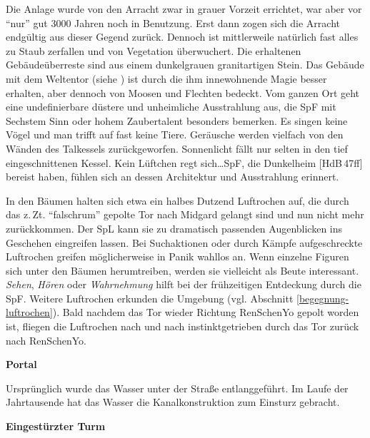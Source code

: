 \documentclass[
a4paper,
twoside,
DIV=calc,
BCOR=4mm,
fontsize=9pt,
twocolumn=on,
titlepage=on,
parskip=half
]{scrartcl}
\begin{document}
Die Anlage wurde von den Arracht zwar in grauer Vorzeit errichtet, war
aber vor "`nur"' gut 3000 Jahren noch in Benutzung. Erst dann zogen
sich die Arracht endgültig aus dieser Gegend zurück. Dennoch ist
mittlerweile natürlich fast alles zu Staub zerfallen und von
Vegetation überwuchert. Die erhaltenen Gebäudeüberreste sind aus einem
dunkelgrauen granitartigen Stein. Das Gebäude mit dem Weltentor (siehe
) ist durch die ihm innewohnende Magie besser erhalten, aber
dennoch von Moosen und Flechten bedeckt. Vom ganzen Ort geht eine
undefinierbare düstere und unheimliche Ausstrahlung aus, die SpF mit
Sechstem Sinn oder hohem Zaubertalent besonders bemerken. Es singen
keine Vögel und man trifft auf fast keine Tiere. Geräusche werden
vielfach von den Wänden des Talkessels zurückgeworfen. Sonnenlicht
fällt nur selten in den tief eingeschnittenen Kessel. Kein Lüftchen
regt sich\dots SpF, die Dunkelheim [HdB\,47ff] bereist haben, fühlen
sich an dessen Architektur und Ausstrahlung erinnert.

In den Bäumen halten sich etwa ein halbes Dutzend Luftrochen auf, die
durch das z.\,Zt. "`falschrum"' gepolte Tor nach Midgard gelangt sind
und nun nicht mehr zurückkommen. Der SpL kann sie zu dramatisch
passenden Augenblicken ins Geschehen eingreifen lassen. Bei
Suchaktionen oder durch Kämpfe aufgeschreckte Luftrochen greifen
möglicherweise in Panik wahllos an. Wenn einzelne Figuren sich unter
den Bäumen herumtreiben, werden sie vielleicht als Beute
interessant. \emph{Sehen}, \emph{Hören} oder \emph{Wahrnehmung} hilft
bei der frühzeitigen Entdeckung durch die SpF.  Weitere Luftrochen
erkunden die Umgebung (vgl. Abschnitt
\ref{begegnung-luftrochen}). Bald nachdem das Tor wieder Richtung
RenSchenYo gepolt worden ist, fliegen die Luftrochen nach und nach
instinktgetrieben durch das Tor zurück nach RenSchenYo.

\textbf{ Portal}


Ursprünglich wurde das Wasser unter der Straße entlanggeführt. Im
Laufe der Jahrtausende hat das Wasser die Kanalkonstruktion zum
Einsturz gebracht.

\textbf{ Eingestürzter Turm}
\end{document}
